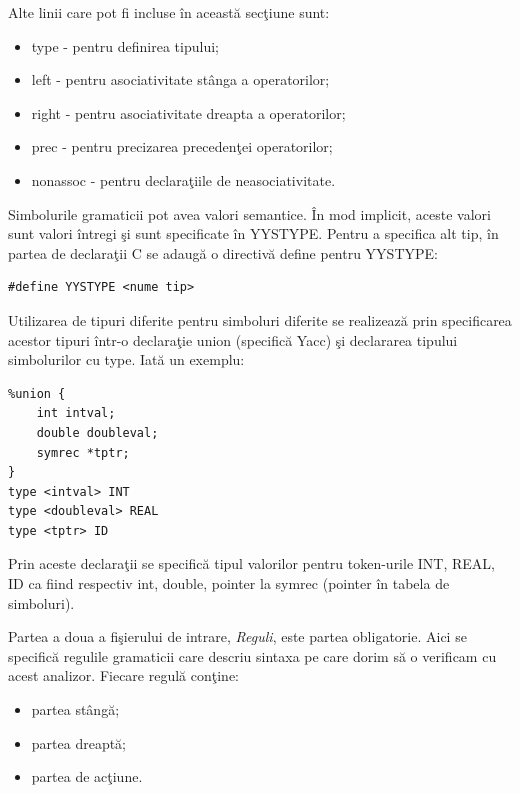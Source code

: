 Alte linii care pot fi incluse \^{i}n aceast\u{a} sec\c{t}iune sunt:
\begin{itemize}
	\item type - pentru definirea tipului;
	\item left - pentru asociativitate st\^{a}nga a operatorilor;
	\item right - pentru asociativitate dreapta a operatorilor;
	\item prec - pentru precizarea preceden\c{t}ei operatorilor;
	\item nonassoc - pentru declara\c{t}iile de neasociativitate.
\end{itemize}

Simbolurile gramaticii pot avea valori semantice. \^{I}n mod implicit, aceste valori sunt valori \^{i}ntregi \c{s}i sunt specificate \^{i}n YYSTYPE. Pentru a specifica alt tip, \^{i}n partea de declara\c{t}ii C se adaug\u{a} o directiv\u{a} define pentru YYSTYPE:
\begin{verbatim}
#define YYSTYPE <nume tip>
\end{verbatim}

Utilizarea de tipuri diferite pentru simboluri diferite se realizeaz\u{a} prin specificarea acestor tipuri \^{i}ntr-o declara\c{t}ie union (specific\u{a} Yacc) \c{s}i declararea tipului simbolurilor cu type. Iat\u{a} un exemplu:
\begin{verbatim}
%union {
	int intval;
	double doubleval;
	symrec *tptr;
}
type <intval> INT
type <doubleval> REAL
type <tptr> ID
\end{verbatim}

Prin aceste declara\c{t}ii se specific\u{a} tipul valorilor pentru token-urile INT, REAL, ID ca fiind respectiv int, double, pointer la symrec (pointer \^{i}n tabela de simboluri).

Partea a doua a fi\c{s}ierului de intrare, \emph{Reguli}, este partea obligatorie. Aici se specific\u{a} regulile gramaticii care descriu sintaxa pe care dorim s\u{a} o verificam cu acest analizor. Fiecare regul\u{a} con\c{t}ine:
\begin{itemize}
	\item partea st\^{a}ng\u{a};
	\item partea dreapt\u{a};
	\item partea de ac\c{t}iune.
\end{itemize}

